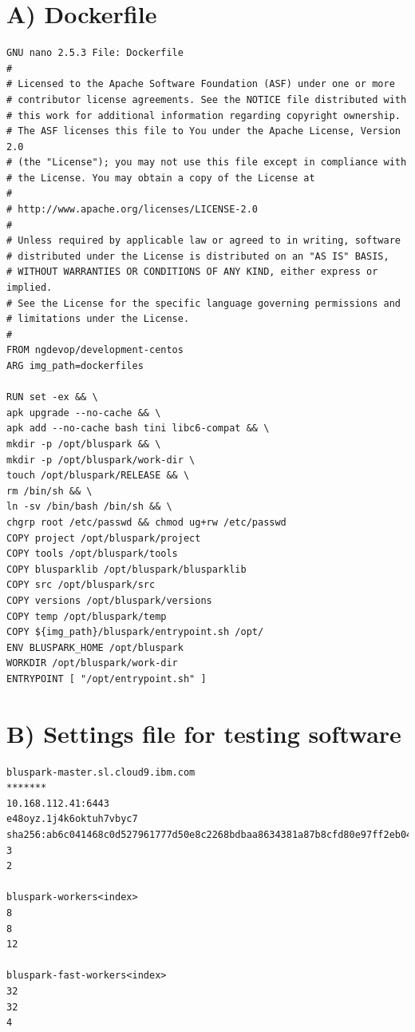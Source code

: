 
\appendix
\addappheadtotoc
\appendixpage




\chapter*{A) Dockerfile}
\begin{lstlisting}
GNU nano 2.5.3 File: Dockerfile
#
# Licensed to the Apache Software Foundation (ASF) under one or more
# contributor license agreements. See the NOTICE file distributed with
# this work for additional information regarding copyright ownership.
# The ASF licenses this file to You under the Apache License, Version 2.0
# (the "License"); you may not use this file except in compliance with
# the License. You may obtain a copy of the License at
#
# http://www.apache.org/licenses/LICENSE-2.0
#
# Unless required by applicable law or agreed to in writing, software
# distributed under the License is distributed on an "AS IS" BASIS,
# WITHOUT WARRANTIES OR CONDITIONS OF ANY KIND, either express or implied.
# See the License for the specific language governing permissions and
# limitations under the License.
#
FROM ngdevop/development-centos
ARG img_path=dockerfiles

RUN set -ex && \
apk upgrade --no-cache && \
apk add --no-cache bash tini libc6-compat && \
mkdir -p /opt/bluspark && \
mkdir -p /opt/bluspark/work-dir \
touch /opt/bluspark/RELEASE && \
rm /bin/sh && \
ln -sv /bin/bash /bin/sh && \
chgrp root /etc/passwd && chmod ug+rw /etc/passwd
COPY project /opt/bluspark/project
COPY tools /opt/bluspark/tools
COPY blusparklib /opt/bluspark/blusparklib
COPY src /opt/bluspark/src
COPY versions /opt/bluspark/versions
COPY temp /opt/bluspark/temp
COPY ${img_path}/bluspark/entrypoint.sh /opt/
ENV BLUSPARK_HOME /opt/bluspark
WORKDIR /opt/bluspark/work-dir
ENTRYPOINT [ "/opt/entrypoint.sh" ]
\end{lstlisting}

\chapter*{B) Settings file for testing software}
\begin{lstlisting}
bluspark-master.sl.cloud9.ibm.com
*******
10.168.112.41:6443
e48oyz.1j4k6oktuh7vbyc7
sha256:ab6c041468c0d527961777d50e8c2268bdbaa8634381a87b8cfd80e97ff2eb04
3
2

bluspark-workers<index>
8
8
12

bluspark-fast-workers<index>
32
32
4
\end{lstlisting}

